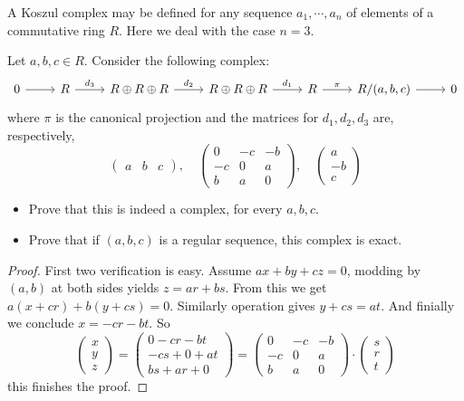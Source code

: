 \begin{exercise}\label{Kos comp-2}
A Koszul complex may be defined for any sequence $a_1,\cdots,a_n$ of elements of a commutative ring $R$. Here we deal with the case $n=3$.\par
Let $a,b,c\in R$. Consider the following complex:
\[\begin{tikzcd}
0\ar[r]&R\ar[r,"d_3"]&R\oplus R\oplus R\ar[r,"d_2"]&R\oplus R\oplus R\ar[r,"d_1"]&R\ar[r,"\pi"]&R/(a,b,c)\ar[r]&0
\end{tikzcd}\]
where $\pi$ is the canonical projection and the matrices for $d_1,d_2,d_3$ are, respectively,
\[\begin{pmatrix}
a&b&c
\end{pmatrix},\quad\begin{pmatrix}
0&-c&-b\\
-c&0&a\\
b&a&0
\end{pmatrix},\quad\begin{pmatrix}
a\\
-b\\
c
\end{pmatrix}\]
\begin{itemize}
\item Prove that this is indeed a complex, for every $a,b,c$.
\item Prove that if $(a,b,c)$ is a regular sequence, this complex is exact.
\end{itemize}
\end{exercise}
\begin{proof}
First two verification is easy. Assume $ax+by+cz=0$, modding by $(a,b)$ at both sides yields $z=ar+bs$. From this we get $a(x+cr)+b(y+cs)=0$. Similarly operation gives $y+cs=at$. And finially we conclude $x=-cr-bt$. So
\[\begin{pmatrix}
x\\
y\\
z
\end{pmatrix}=\begin{pmatrix}
0-cr-bt\\
-cs+0+at\\
bs+ar+0
\end{pmatrix}=\begin{pmatrix}
0&-c&-b\\
-c&0&a\\
b&a&0
\end{pmatrix}\cdot\begin{pmatrix}
s\\
r\\
t
\end{pmatrix}\]
this finishes the proof.
\end{proof}
